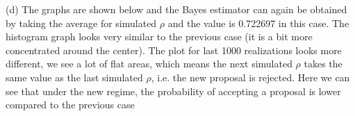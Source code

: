 \documentclass{homeworg}
\begin{document}
(d)%
The graphs are shown below and the Bayes estimator can again be obtained by taking the average for simulated $\rho$ and the value is 0.722697 in this case. The histogram graph looks very similar to the previous case (it is a bit more concentrated around the center). The plot for last 1000 realizations looks more different, we see a lot of flat areas, which means the next simulated $\rho$ takes the same value as the last simulated $\rho$, i.e. the new proposal is rejected. Here we can see that under the new regime, the probability of accepting a proposal is lower compared to the previous case
\end{document}
